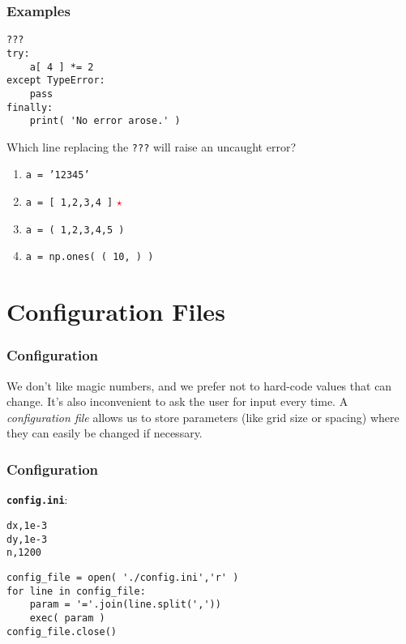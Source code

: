 \documentclass[11pt]{beamer}
\newcommand{\correctstar}{{\Large\textcolor{red}{$\star$}}}
\begin{document}
\begin{frame}[fragile]
  \frametitle{Examples}
  \Enlarge

  \begin{Verbatim}
???
try:
    a[ 4 ] *= 2
except TypeError:
    pass
finally:
    print( 'No error arose.' )
  \end{Verbatim}

  Which line replacing the \texttt{???} will raise an uncaught error?

  \begin{enumerate}[label=\Alph*]
    \item  \texttt{a = '12345'}
    \item  \texttt{a = [ 1,2,3,4 ]}  \correctstar
    \item  \texttt{a = ( 1,2,3,4,5 )}
    \item  \texttt{a = np.ones( ( 10, ) )}
  \end{enumerate}
\end{frame}

\section{Configuration Files}

\begin{frame}[fragile]
  \frametitle{Configuration}
  \Enlarge

  \begin{enumerate}
  \myitem  We don't like magic numbers, and we prefer not to hard-code values that can change.
  \myitem  It's also inconvenient to ask the user for input every time. \pause
  \myitem  A \emph{configuration file} allows us to store parameters (like grid size or spacing) where they can easily be changed if necessary.
  \end{enumerate}
\end{frame}

\begin{frame}[fragile]
  \frametitle{Configuration}
  \Enlarge

  {\textbf\texttt{config.ini}}:
  \begin{Verbatim}
dx,1e-3
dy,1e-3
n,1200
  \end{Verbatim}
  \bigskip
  \begin{Verbatim}
config_file = open( './config.ini','r' )
for line in config_file:
    param = '='.join(line.split(','))
    exec( param )
config_file.close()
  \end{Verbatim}
\end{frame}
\end{document}
